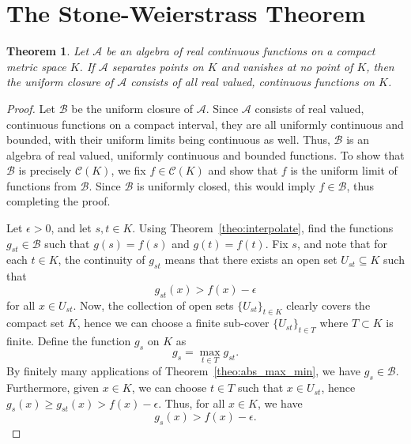 \documentclass[11pt]{article}
\newtheorem{theorem}{Theorem}[section]
\theoremstyle{definition}
\theoremstyle{remark}
\begin{document}
    \section{The Stone-Weierstrass Theorem}
    \begin{theorem} \label{theo:stone_weierstrass}
        Let $\mathscr{A}$ be an algebra of real continuous functions on a compact
        metric space $K$. If $\mathscr{A}$ separates points on $K$ and vanishes at no
        point of $K$, then the uniform closure of $\mathscr{A}$ consists of all real
        valued, continuous functions on $K$.
    \end{theorem}
    \begin{proof}
        Let $\mathscr{B}$ be the uniform closure of $\mathscr{A}$. Since
        $\mathscr{A}$ consists of real valued, continuous functions on a compact
        interval, they are all uniformly continuous and bounded, with their uniform
        limits being continuous as well. Thus, $\mathscr{B}$ is an algebra of real
        valued, uniformly continuous and bounded functions. To show that
        $\mathscr{B}$ is precisely $\mathscr{C}(K)$, we fix $f \in \mathscr{C}(K)$
        and show that $f$ is the uniform limit of functions from $\mathscr{B}$. Since
        $\mathscr{B}$ is uniformly closed, this would imply $f \in \mathscr{B}$, thus
        completing the proof.

        Let $\epsilon > 0$, and let $s, t \in K$. Using
        Theorem~\ref{theo:interpolate}, find the functions $g_{st} \in \mathscr{B}$
        such that $g(s) = f(s)$ and $g(t) = f(t)$. Fix $s$, and note that for each $t
        \in K$, the continuity of $g_{st}$ means that there exists an open set
        $U_{st} \subseteq K$ such that \[
            g_{st}(x) > f(x) - \epsilon
        \] for all $x \in U_{st}$. Now, the collection of open sets $\{U_{st}\}_{t
        \in K}$ clearly covers the compact set $K$, hence we can choose a finite
        sub-cover $\{U_{st}\}_{t \in T}$ where $T \subset K$ is finite.
        Define the function $g_s$ on $K$ as \[
            g_s = \max_{t \in T} g_{st}.
        \] By finitely many applications of Theorem~\ref{theo:abs_max_min}, we have
        $g_s \in \mathscr{B}$. Furthermore, given $x \in K$, we can choose $t \in T$
        such that $x \in U_{st}$, hence $g_s(x) \geq g_{st}(x) > f(x) - \epsilon$.
        Thus, for all $x \in K$, we have \[
            g_s(x) > f(x) - \epsilon.
        \] 
        

\end{proof}
\end{document}
